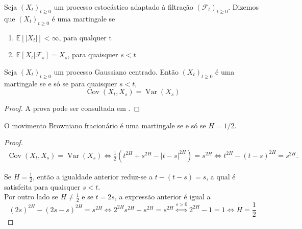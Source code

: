 \documentclass{article}
\begin{document}
\vspace{1cm}

\begin{dfn}\label{dfn:martingale}
    Seja $(X_t)_{t\geq0}$ um processo estocástico adaptado à filtração $(\mathcal{F}_t)_{t\geq0}$. Dizemos que $(X_t)_{t \geq 0}$ é uma martingale se
    
    \begin{enumerate}
        \item $\mathbb{E}[|X_t|]<\infty$, para qualquer t
        \item $\mathbb{E}[X_t |\mathcal{F}_s]=X_s$, para quaisquer $s<t$
    \end{enumerate}
\end{dfn}

\vspace{1cm}

\begin{prop}
    Seja $(X_t)_{t \geq0}$ um processo Gaussiano centrado. Então $(X_t)_{t \geq0}$ é uma martingale se e só se para quaisquer $s<t$, $$\operatorname{Cov}(X_t,X_s)=\operatorname{Var}(X_s)$$
\end{prop}

\begin{proof}
    A prova pode ser consultada em \cite{Kallenberg1997}.
\end{proof}

\vspace{1cm}

\begin{thm}
    O movimento Browniano fracionário é uma martingale se e só se $H=1/2.$
\end{thm}
\begin{proof}   
    \begin{align*}
        \operatorname{Cov}(X_t,X_s)=\operatorname{Var}(X_s) \Leftrightarrow \frac{1}{2}(t^{2H}+s^{2H}-|t-s|^{2H})=s^{2H} \Leftrightarrow t^{2H}-(t-s)^{2H}=s^{2H}.       
    \end{align*}

    Se $H=\frac{1}{2}$, então a igualdade anterior reduz-se a $t-(t-s)=s$, a qual é satisfeita para quaisquer $s<t$.\\
    
    Por outro lado se $H \neq\frac{1}{2}$ e se $t=2s$, a expressão anterior é igual a
    $$(2s)^{2H}-(2s-s)^{2H}=s^{2H} \Leftrightarrow 2^{2H}s^{2H}-s^{2H}=s^{2H} \overset{s > 0}{\Leftrightarrow} 2^{2H}-1=1 \Leftrightarrow H=\frac{1}{2}$$
\end{proof}
\end{document}
